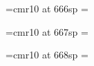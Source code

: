 \newcount\cstRange
\newcount\cstRangeSqrt

\newcount\instance
\mathchardef{}

\newwrite\out

\newcount\wheelmodulus
% 
%
%
%
\font\wheelcogids=cmr10 at 666sp
%
%
%
\fontdimen\wheelmodulus\wheelcogids=\z@
%
%
%


\font\wheelcognext=cmr10 at 667sp
\fontdimen\wheelmodulus\wheelcognext=\z@

\font\wheelcogdeltas=cmr10 at 668sp
\fontdimen\wheelmodulus\wheelcogdeltas=\z@

